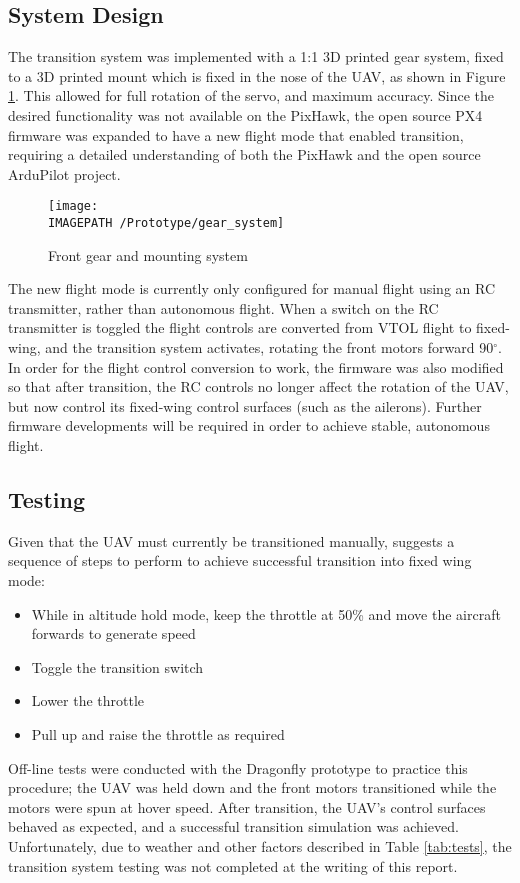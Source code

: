 \subsection{System Design}
\label{sec:controller}
The transition system was implemented with a 1:1 3D printed gear system, fixed to a 3D printed mount which is fixed in the nose of the UAV, as shown in Figure \ref{fig:gearsys}. This allowed for full rotation of the servo, and maximum accuracy. Since the desired functionality was not available on the PixHawk, the open source PX4 firmware was expanded to have a new flight mode that enabled transition, requiring a detailed understanding of both the PixHawk \cite{ref:firmware1} and the open source ArduPilot \cite{ref:firmware2} project.

\begin{figure}[!ht]
	\centering
	\texttt{[image: \\IMAGEPATH /Prototype/gear\_system]}
	\caption{Front gear and mounting system}
	\label{fig:gearsys}
\end{figure}

The new flight mode is currently only configured for manual flight using an RC transmitter, rather than autonomous flight. When a switch on the RC transmitter is toggled the flight controls are converted from VTOL flight to fixed-wing, and the transition system activates, rotating the front motors forward 90$^\circ$. In order for the flight control conversion to work, the firmware was also modified so that after transition, the RC controls no longer affect the rotation of the UAV, but now control its fixed-wing control surfaces (such as the ailerons). Further firmware developments will be required in order to achieve stable, autonomous flight.\\

\subsection{Testing}
Given that the UAV must currently be transitioned manually, \cite{ref:fireflyinstruction} suggests a sequence of steps to perform to achieve successful transition into fixed wing mode: 
\begin{itemize}
\item While in altitude hold mode, keep the throttle at 50\% and move the aircraft forwards to generate speed
\item Toggle the transition switch 
\item Lower the throttle
\item Pull up and raise the throttle as required		
\end{itemize}

Off-line tests were conducted with the Dragonfly prototype to practice this procedure; the UAV was held down and the front motors transitioned while the motors were spun at hover speed. After transition, the UAV's control surfaces behaved as expected, and a successful transition simulation was achieved. Unfortunately, due to weather and other factors described in Table \ref{tab:tests}, the transition system testing was not completed at the writing of this report.
